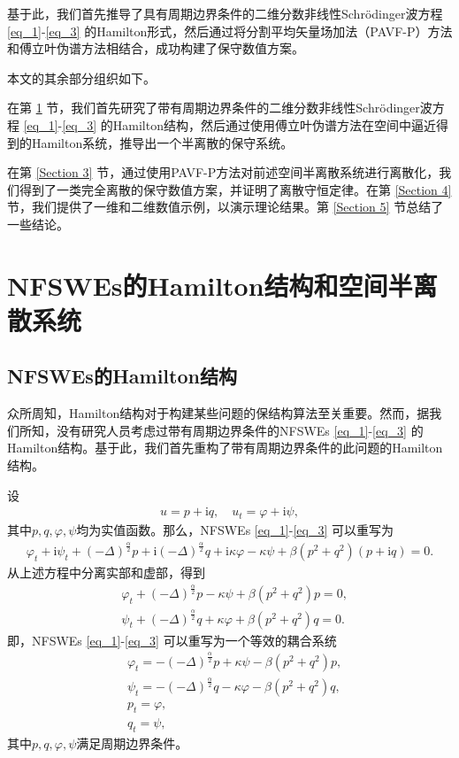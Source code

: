 基于此，我们首先推导了具有周期边界条件的二维分数非线性Schr{\"o}dinger波方程 \eqref{eq_1}-\eqref{eq_3} 的Hamilton形式，然后通过将分割平均矢量场加法（PAVF-P）方法和傅立叶伪谱方法相结合，成功构建了保守数值方案。

本文的其余部分组织如下。

在第 \ref{Section 2} 节，我们首先研究了带有周期边界条件的二维分数非线性Schr{\"o}dinger波方程 \eqref{eq_1}-\eqref{eq_3} 的Hamilton结构，然后通过使用傅立叶伪谱方法在空间中逼近得到的Hamilton系统，推导出一个半离散的保守系统。

在第 \ref{Section 3} 节，通过使用PAVF-P方法对前述空间半离散系统进行离散化，我们得到了一类完全离散的保守数值方案，并证明了离散守恒定律。在第 \ref{Section 4} 节，我们提供了一维和二维数值示例，以演示理论结果。第 \ref{Section 5} 节总结了一些结论。

\section{NFSWEs的Hamilton结构和空间半离散系统}\label{Section 2}
\subsection{NFSWEs的Hamilton结构}
众所周知，Hamilton结构对于构建某些问题的保结构算法至关重要。然而，据我们所知，没有研究人员考虑过带有周期边界条件的NFSWEs \eqref{eq_1}-\eqref{eq_3} 的Hamilton结构。基于此，我们首先重构了带有周期边界条件的此问题的Hamilton结构。

设
\begin{align}
u = p+\mathrm{i}q, \quad u_t = \varphi+ \mathrm{i}\psi,
\end{align}
其中$p, q,\varphi,\psi$均为实值函数。那么，NFSWEs \eqref{eq_1}-\eqref{eq_3} 可以重写为
\begin{align}\label{eq_28}
\varphi_{t}+\mathrm{i}\psi_{t}+\left( -\Delta \right) ^{\frac{\alpha }{2}}p+\mathrm{i}\left( -\Delta \right) ^{\frac{\alpha }{2}}q+\mathrm{i}\kappa \varphi-\kappa \psi+\beta \left( p^{2}+q^{2}\right) \left( p+\mathrm{i} q\right) =0.
\end{align}
从上述方程中分离实部和虚部，得到
\begin{align}
&\varphi_{t}+\left( -\Delta \right) ^{\frac{\alpha }{2}}p-\kappa \psi+\beta \left( p^{2}+q^{2}\right)p=0,\nonumber\\
&\psi_{t}+\left( -\Delta \right) ^{\frac{\alpha }{2}}q+\kappa \varphi+\beta \left( p^{2}+q^{2}\right)q=0.\label{eq_29}
\end{align}
即，NFSWEs \eqref{eq_1}-\eqref{eq_3} 可以重写为一个等效的耦合系统
\begin{align}
&\varphi_{t}=-\left( -\Delta \right) ^{\frac{\alpha }{2}}p+\kappa \psi-\beta \left( p^{2}+q^{2}\right)p\label{eq_30},\\
&\psi_{t}=-\left( -\Delta \right) ^{\frac{\alpha }{2}}q-\kappa \varphi-\beta \left( p^{2}+q^{2}\right)q\label{eq_31},\\
&p_t=\varphi, \label{eq_32}\\
&q_t=\psi, \label{eq_33}
\end{align}
其中$p, q,\varphi,\psi$满足周期边界条件。

